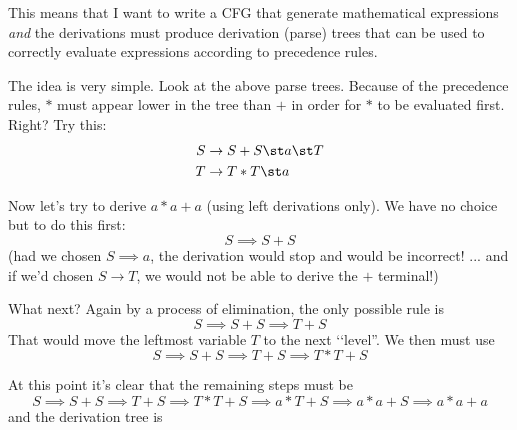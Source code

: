 This means that I want to write a CFG that generate mathematical expressions
\textit{ and} the derivations must produce derivation (parse) trees that can be
used to correctly evaluate expressions according to precedence rules.

The idea is very simple. Look at the above parse trees.
Because of the precedence rules, $*$ must appear lower in the tree than
$+$ in order for $*$ to be evaluated first. 
Right?
Try this:
\begin{align*}
S &\rightarrow S + S \st a \st T \\
T &\rightarrow T * T \st a
\end{align*}

Now let's try to derive $a * a + a$ (using left derivations only).
We have no choice but to do this first:
\[
S \implies S + S
\]
(had we chosen $S \implies a$, the derivation would stop and would be
incorrect! ... and if we'd chosen $S \rightarrow T$, we would not be able
to derive the $+$ terminal!)

What next? Again by a process of elimination, the only possible rule is
\[
S \implies S + S \implies T + S
\]
That would move the leftmost variable $T$ to the next \lq\lq level''.
We then must use
\[
S \implies S + S \implies T + S \implies T * T + S
\]

At this point it's clear that the remaining steps must be
\[
S \implies S + S \implies T + S \implies T * T + S
\implies a * T + S
\implies a*a + S
\implies a*a + a
\]
and the derivation tree is


